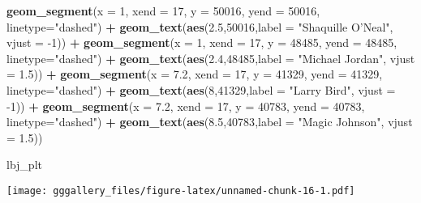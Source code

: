 \documentclass[]{book}
\newenvironment{Shaded}{\begin{snugshade}}{\end{snugshade}}
\newcommand{\DataTypeTok}[1]{\textcolor[rgb]{0.13,0.29,0.53}{#1}}
\newcommand{\DecValTok}[1]{\textcolor[rgb]{0.00,0.00,0.81}{#1}}
\newcommand{\FloatTok}[1]{\textcolor[rgb]{0.00,0.00,0.81}{#1}}
\newcommand{\KeywordTok}[1]{\textcolor[rgb]{0.13,0.29,0.53}{\textbf{#1}}}
\newcommand{\NormalTok}[1]{#1}
\newcommand{\OperatorTok}[1]{\textcolor[rgb]{0.81,0.36,0.00}{\textbf{#1}}}
\newcommand{\StringTok}[1]{\textcolor[rgb]{0.31,0.60,0.02}{#1}}
\begin{document}
\begin{Shaded}
\begin{Highlighting}[]
\StringTok{  }\KeywordTok{geom_segment}\NormalTok{(}\DataTypeTok{x =} \DecValTok{1}\NormalTok{, }\DataTypeTok{xend =} \DecValTok{17}\NormalTok{, }\DataTypeTok{y =} \DecValTok{50016}\NormalTok{, }\DataTypeTok{yend =} \DecValTok{50016}\NormalTok{, }\DataTypeTok{linetype=}\StringTok{"dashed"}\NormalTok{) }\OperatorTok{+}\StringTok{ }
\StringTok{  }\KeywordTok{geom_text}\NormalTok{(}\KeywordTok{aes}\NormalTok{(}\FloatTok{2.5}\NormalTok{,}\DecValTok{50016}\NormalTok{,}\DataTypeTok{label =} \StringTok{"Shaquille O'Neal"}\NormalTok{, }\DataTypeTok{vjust =} \DecValTok{-1}\NormalTok{)) }\OperatorTok{+}
\StringTok{  }\KeywordTok{geom_segment}\NormalTok{(}\DataTypeTok{x =} \DecValTok{1}\NormalTok{, }\DataTypeTok{xend =} \DecValTok{17}\NormalTok{, }\DataTypeTok{y =} \DecValTok{48485}\NormalTok{, }\DataTypeTok{yend =} \DecValTok{48485}\NormalTok{, }\DataTypeTok{linetype=}\StringTok{"dashed"}\NormalTok{) }\OperatorTok{+}\StringTok{ }
\StringTok{  }\KeywordTok{geom_text}\NormalTok{(}\KeywordTok{aes}\NormalTok{(}\FloatTok{2.4}\NormalTok{,}\DecValTok{48485}\NormalTok{,}\DataTypeTok{label =} \StringTok{"Michael Jordan"}\NormalTok{, }\DataTypeTok{vjust =} \FloatTok{1.5}\NormalTok{)) }\OperatorTok{+}
\StringTok{  }\KeywordTok{geom_segment}\NormalTok{(}\DataTypeTok{x =} \FloatTok{7.2}\NormalTok{, }\DataTypeTok{xend =} \DecValTok{17}\NormalTok{, }\DataTypeTok{y =} \DecValTok{41329}\NormalTok{, }\DataTypeTok{yend =} \DecValTok{41329}\NormalTok{, }\DataTypeTok{linetype=}\StringTok{"dashed"}\NormalTok{) }\OperatorTok{+}\StringTok{ }
\StringTok{  }\KeywordTok{geom_text}\NormalTok{(}\KeywordTok{aes}\NormalTok{(}\DecValTok{8}\NormalTok{,}\DecValTok{41329}\NormalTok{,}\DataTypeTok{label =} \StringTok{"Larry Bird"}\NormalTok{, }\DataTypeTok{vjust =} \DecValTok{-1}\NormalTok{)) }\OperatorTok{+}
\StringTok{  }\KeywordTok{geom_segment}\NormalTok{(}\DataTypeTok{x =} \FloatTok{7.2}\NormalTok{, }\DataTypeTok{xend =} \DecValTok{17}\NormalTok{, }\DataTypeTok{y =} \DecValTok{40783}\NormalTok{, }\DataTypeTok{yend =} \DecValTok{40783}\NormalTok{, }\DataTypeTok{linetype=}\StringTok{"dashed"}\NormalTok{) }\OperatorTok{+}
\StringTok{  }\KeywordTok{geom_text}\NormalTok{(}\KeywordTok{aes}\NormalTok{(}\FloatTok{8.5}\NormalTok{,}\DecValTok{40783}\NormalTok{,}\DataTypeTok{label =} \StringTok{"Magic Johnson"}\NormalTok{, }\DataTypeTok{vjust =} \FloatTok{1.5}\NormalTok{)) }

\NormalTok{lbj_plt}
\end{Highlighting}
\end{Shaded}

\texttt{[image: gggallery\_files/figure-latex/unnamed-chunk-16-1.pdf]}
\end{document}
